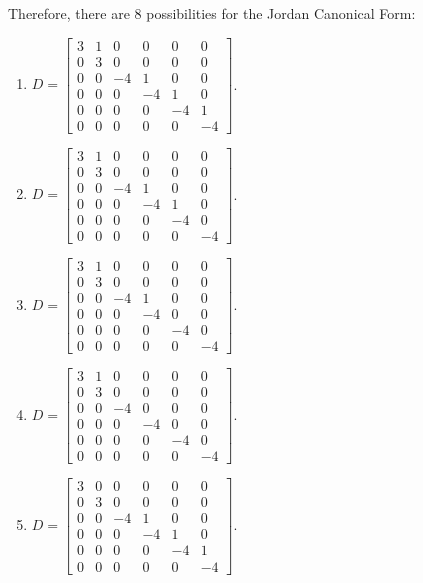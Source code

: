 \documentclass[12pt]{article}
\begin{document}
Therefore, there are $8$ possibilities for the Jordan Canonical Form:
\begin{multicols}{2}
	\begin{enumerate}
	\item[1.] $D = \begin{bmatrix}
	3 & 1 & 0 & 0 & 0 & 0 \\
	0 & 3 & 0 & 0 & 0 & 0 \\
	0 & 0 & -4 & 1 & 0 & 0 \\
	0 & 0 & 0 & -4 & 1 & 0 \\
	0 & 0 & 0 & 0 & -4 & 1 \\
	0 & 0 & 0 & 0 & 0 & -4
	\end{bmatrix}$.
	\item[3.] $D = \begin{bmatrix}
	3 & 1 & 0 & 0 & 0 & 0 \\
	0 & 3 & 0 & 0 & 0 & 0 \\
	0 & 0 & -4 & 1 & 0 & 0 \\
	0 & 0 & 0 & -4 & 1 & 0 \\
	0 & 0 & 0 & 0 & -4 & 0 \\
	0 & 0 & 0 & 0 & 0 & -4
	\end{bmatrix}$.
	\item[5.] $D = \begin{bmatrix}
	3 & 1 & 0 & 0 & 0 & 0 \\
	0 & 3 & 0 & 0 & 0 & 0 \\
	0 & 0 & -4 & 1 & 0 & 0 \\
	0 & 0 & 0 & -4 & 0 & 0 \\
	0 & 0 & 0 & 0 & -4 & 0 \\
	0 & 0 & 0 & 0 & 0 & -4
	\end{bmatrix}$.
	\item[7.] $D = \begin{bmatrix}
	3 & 1 & 0 & 0 & 0 & 0 \\
	0 & 3 & 0 & 0 & 0 & 0 \\
	0 & 0 & -4 & 0 & 0 & 0 \\
	0 & 0 & 0 & -4 & 0 & 0 \\
	0 & 0 & 0 & 0 & -4 & 0 \\
	0 & 0 & 0 & 0 & 0 & -4
	\end{bmatrix}$.
	
	\item[2.] $D = \begin{bmatrix}
	3 & 0 & 0 & 0 & 0 & 0 \\
	0 & 3 & 0 & 0 & 0 & 0 \\
	0 & 0 & -4 & 1 & 0 & 0 \\
	0 & 0 & 0 & -4 & 1 & 0 \\
	0 & 0 & 0 & 0 & -4 & 1 \\
	0 & 0 & 0 & 0 & 0 & -4
	\end{bmatrix}$.
	

\end{enumerate}
\end{multicols}
\end{document}
